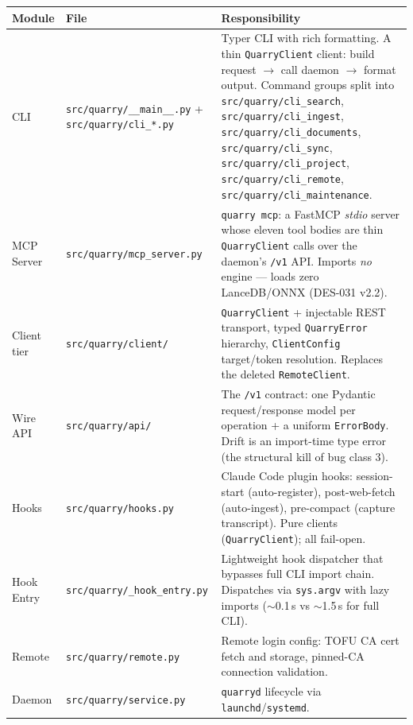 \documentclass[a4paper,10pt]{article}
\newcommand{\modpath}[1]{\texttt{src/quarry/#1}}
\begin{document}
\begin{center}
\begin{tabular}{llp{7cm}}
\toprule
\textbf{Module} & \textbf{File} & \textbf{Responsibility} \\
\midrule
CLI         & \modpath{\_\_main\_\_.py} + \modpath{cli\_*.py} & Typer
              CLI with rich formatting.  A thin \texttt{QuarryClient}
              client: build request $\to$ call daemon $\to$ format
              output.  Command groups split into \modpath{cli\_search},
              \modpath{cli\_ingest}, \modpath{cli\_documents},
              \modpath{cli\_sync}, \modpath{cli\_project},
              \modpath{cli\_remote}, \modpath{cli\_maintenance}. \\
MCP Server  & \modpath{mcp\_server.py}  & \texttt{quarry mcp}: a FastMCP
              \emph{stdio} server whose eleven tool bodies are thin
              \texttt{QuarryClient} calls over the daemon's \texttt{/v1}
              API.  Imports \emph{no} engine --- loads zero
              LanceDB/ONNX (DES-031 v2.2). \\
Client tier & \modpath{client/}          & \texttt{QuarryClient} +
              injectable REST transport, typed \texttt{QuarryError}
              hierarchy, \texttt{ClientConfig} target/token resolution.
              Replaces the deleted \texttt{RemoteClient}. \\
Wire API    & \modpath{api/}             & The \texttt{/v1} contract:
              one Pydantic request/response model per operation +
              a uniform \texttt{ErrorBody}.  Drift is an import-time
              type error (the structural kill of bug class 3). \\
Hooks       & \modpath{hooks.py}        & Claude Code plugin hooks:
              session-start (auto-register), post-web-fetch
              (auto-ingest), pre-compact (capture transcript).  Pure
              clients (\texttt{QuarryClient}); all fail-open. \\
Hook Entry  & \modpath{\_hook\_entry.py} & Lightweight hook dispatcher
              that bypasses full CLI import chain.  Dispatches
              via \texttt{sys.argv} with lazy imports
              ($\sim$0.1\,s vs $\sim$1.5\,s for full CLI). \\
Remote      & \modpath{remote.py}       & Remote login config:
              TOFU CA cert fetch and storage, pinned-CA connection
              validation. \\
Daemon      & \modpath{service.py}      & \texttt{quarryd} lifecycle
              via \texttt{launchd}/\texttt{systemd}. \\
\bottomrule
\end{tabular}
\end{center}
\end{document}
